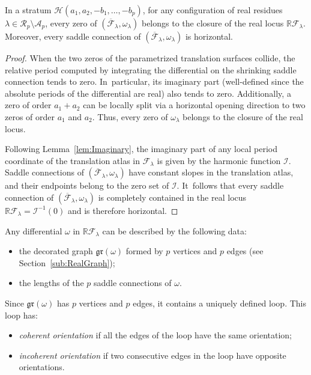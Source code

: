 \begin{lem}\label{lem:RealLocus}
In a stratum $\mathcal{H}(a_{1},a_{2},-b_{1},\dots,-b_{p})$, for any configuration of real residues $\lambda\in \mathcal{R}_p\setminus\mathcal{A}_{p}$, every zero of $(\overline{\mathcal{F}}_{\lambda},\omega_{\lambda})$ belongs to the closure of the real locus $\mathbb{R}\mathcal{F}_{\lambda}$. Moreover, every saddle connection of $(\overline{\mathcal{F}}_{\lambda},\omega_{\lambda})$ is horizontal.
\end{lem}

\begin{proof}
When the two zeros of the parametrized translation surfaces collide, the relative period computed by integrating the differential on the shrinking saddle connection tends to zero. In~particular, its imaginary part (well-defined since the absolute periods of the differential are real) also tends to zero. Additionally, a zero of order $a_1+a_2$ can be locally split via a horizontal opening direction to two zeros of order $a_1$ and $a_2$. Thus, every zero of $\omega_{\lambda}$ belongs to the closure of the real locus.

Following Lemma~\ref{lem:Imaginary}, the imaginary part of any local period coordinate of the translation atlas in $\mathcal{F}_{\lambda}$ is given by the harmonic function $\mathcal{I}$. Saddle connections of $(\overline{\mathcal{F}}_{\lambda},\omega_{\lambda})$ have constant slopes in the translation atlas, and their endpoints belong to the zero set of $\mathcal{I}$. It~follows that every saddle connection of $(\overline{\mathcal{F}}_{\lambda},\omega_{\lambda})$ is completely contained in the real locus $\mathbb{R}\mathcal{F}_{\lambda} = \mathcal{I}^{-1}(0)$ and is therefore horizontal.
\end{proof}

Any differential $\omega$ in $\mathbb{R}\mathcal{F}_{\lambda}$ can be described by the following data:
\begin{itemize}
\item the decorated graph $\mathfrak{gr}(\omega)$ formed by $p$ vertices and $p$ edges (see Section~\ref{sub:RealGraph});
\item the lengths of the $p$ saddle connections of $\omega$.
\end{itemize}

Since $\mathfrak{gr}(\omega)$ has $p$ vertices and $p$ edges, it contains a uniquely defined loop. This loop has:
\begin{itemize}
\item \textit{coherent orientation} if all the edges of the loop have the same orientation;
\item \textit{incoherent orientation} if two consecutive edges in the loop have opposite orientations.
\end{itemize}

